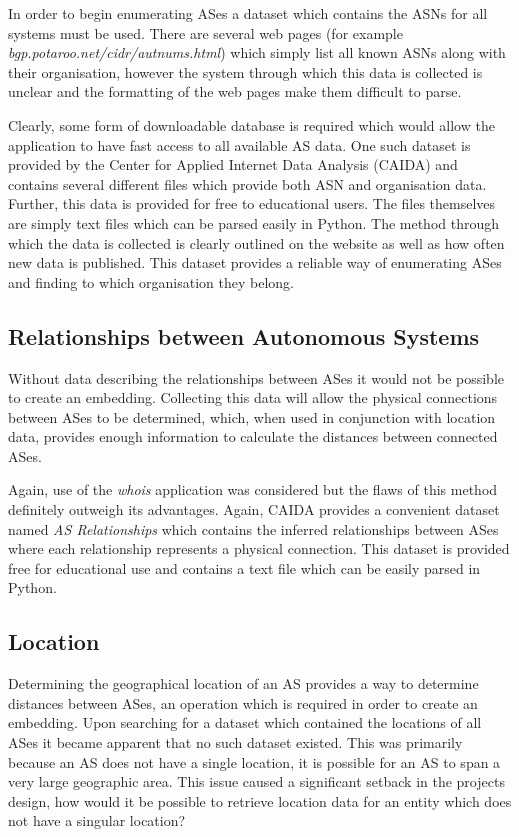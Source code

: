 In order to begin enumerating ASes a dataset which contains the ASNs for all systems must be used. There are several web pages (for example \textit{bgp.potaroo.net/cidr/autnums.html}) which simply list all known ASNs along with their organisation, however the system through which this data is collected is unclear and the formatting of the web pages make them difficult to parse. 

Clearly, some form of downloadable database is required which would allow the application to have fast access to all available AS data. One such dataset is provided by the Center for Applied Internet Data Analysis (CAIDA) and contains several different files which provide both ASN and organisation data. Further, this data is provided for free to educational users. The files themselves are simply text files which can be parsed easily in Python. The method through which the data is collected is clearly outlined on the website as well as how often new data is published. This dataset provides a reliable way of enumerating ASes and finding to which organisation they belong.

\subsection{Relationships between Autonomous Systems}
Without data describing the relationships between ASes it would not be possible to create an embedding. Collecting this data will allow the physical connections between ASes to be determined, which, when used in conjunction with location data, provides enough information to calculate the distances between connected ASes.

Again, use of the \textit{whois} application was considered but the flaws of this method definitely outweigh its advantages. Again, CAIDA provides a convenient dataset named \textit{AS Relationships} which contains the inferred relationships between ASes where each relationship represents a physical connection. This dataset is provided free for educational use and contains a text file which can be easily parsed in Python. 

\subsection{Location}
Determining the geographical location of an AS provides a way to determine distances between ASes, an operation which is required in order to create an embedding. Upon searching for a dataset which contained the locations of all ASes it became apparent that no such dataset existed. This was primarily because an AS does not have a single location, it is possible for an AS to span a very large geographic area. This issue caused a significant setback in the projects design, how would it be possible to retrieve location data for an entity which does not have a singular location?

